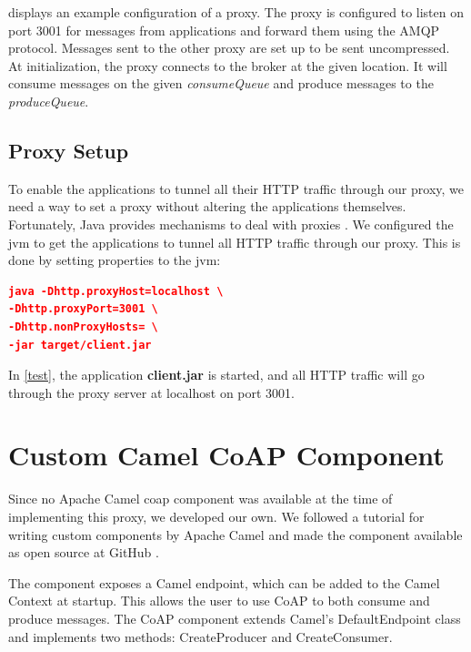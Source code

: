  displays an example configuration of a proxy. The
proxy is configured to listen on port 3001 for messages from applications and
forward them using the AMQP protocol. Messages sent to the other proxy are set
up to be sent uncompressed. At initialization, the proxy connects to the broker
at the given location. It will consume messages on the given
\textit{consumeQueue} and produce messages to the \textit{produceQueue}.





\subsection{Proxy Setup}

To enable the applications to tunnel all their HTTP traffic through our
proxy, we need a way to set a proxy without altering the applications
themselves. Fortunately, Java provides mechanisms to deal with proxies
\cite{oracle-proxy}. We configured the \gls{jvm} to get the applications to
tunnel all HTTP traffic through our proxy. This is done by setting properties to
the \gls{jvm}:


\begin{lstlisting}[frame=single, language=json, caption="Setting a proxy on the \gls{jvm}", label=test]
java -Dhttp.proxyHost=localhost \
-Dhttp.proxyPort=3001 \
-Dhttp.nonProxyHosts= \
-jar target/client.jar
\end{lstlisting}

In \cref{test}, the application \textbf{client.jar} is started, and all HTTP
traffic will go through the proxy server at localhost on port 3001.

\section{Custom Camel CoAP Component}
\label{section:coap-component}

Since no Apache Camel \gls{coap} component was available at the time of implementing
this proxy, we developed our own. We followed a tutorial\cite{camel-tutorial}
for writing custom components by Apache Camel and made the component available
as open source at GitHub \cite{camel-coap-github}.

The component exposes a Camel endpoint, which can be added to the Camel Context
at startup. This allows the user to use CoAP to both consume and produce
messages. The CoAP component extends Camel's DefaultEndpoint class and
implements two methods: CreateProducer and CreateConsumer.


